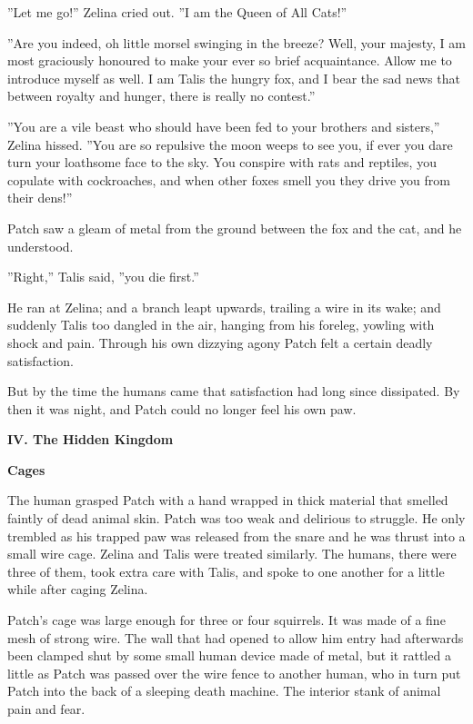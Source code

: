 \documentclass[11pt]{article}
\begin{document}
''Let me go!'' Zelina cried out. ''I am the Queen of All Cats!''\par
''Are you indeed, oh little morsel swinging in the breeze? Well, your majesty, I am most graciously honoured to make your ever so brief acquaintance. Allow me to introduce myself as well. I am Talis the hungry fox, and I bear the sad news that between royalty and hunger, there is really no contest.''\par
''You are a vile beast who should have been fed to your brothers and sisters,'' Zelina hissed. ''You are so repulsive the moon weeps to see you, if ever you dare turn your loathsome face to the sky. You conspire with rats and reptiles, you copulate with cockroaches, and when other foxes smell you they drive you from their dens!''\par
Patch saw a gleam of metal from the ground between the fox and the cat, and he understood.\par
''Right,'' Talis said, ''you die first.''\par
He ran at Zelina; and a branch leapt upwards, trailing a wire in its wake; and suddenly Talis too dangled in the air, hanging from his foreleg, yowling with shock and pain. Through his own dizzying agony Patch felt a certain deadly satisfaction.\par
But by the time the humans came that satisfaction had long since dissipated. By then it was night, and Patch could no longer feel his own paw.\par
\pagebreak \par
{\bf IV. The Hidden Kingdom\par

}\par
{\bf Cages\par
}\par
 The human grasped Patch with a hand wrapped in thick material that smelled faintly of dead animal skin. Patch was too weak and delirious to struggle. He only trembled as his trapped paw was released from the snare and he was thrust into a small wire cage. Zelina and Talis were treated similarly. The humans, there were three of them, took extra care with Talis, and spoke to one another for a little while after caging Zelina.\par
 Patch's cage was large enough for three or four squirrels. It was made of a fine mesh of strong wire. The wall that had opened to allow him entry had afterwards been clamped shut by some small human device made of metal, but it rattled a little as Patch was passed over the wire fence to another human, who in turn put Patch into the back of a sleeping death machine. The interior stank of animal pain and fear.\par
\end{document}
